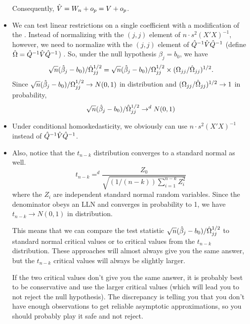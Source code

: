 \begin{itemize}
  Consequently, $\hat{V} = W_n + o_p = V + o_p$.

\item We can test linear restrictions on a single coefficient with a
  modification of the \ttest.  Instead of normalizing with the $(j,j)$
  element of $n \cdot s^2 (X'X)^{-1}$, however, we need to normalize with
  the $(j,j)$ element of $\hat{Q}^{-1} \hat{V} \hat{Q}^{-1}$ (define $\hat{\Omega} =
  \hat{Q}^{-1} \hat{V} \hat{Q}^{-1}$) .  So, under the null hypothesis $\beta_j = b_0$,
  we have
  \begin{equation*}
    \sqrt{n} (\hat{\beta}_j - b_0) / \hat{\Omega}_{jj}^{1/2} =
    \sqrt{n} (\hat{\beta}_j - b_0) / \Omega_{jj}^{1/2} \times (\Omega_{jj} / \hat{\Omega}_{jj})^{1/2}.
  \end{equation*}
  Since $\sqrt{n} (\hat{\beta}_j - b_0) / \Omega_{jj}^{1/2} \to N(0, 1)$ in
  distribution and $(\Omega_{jj} / \hat{\Omega}_{jj})^{1/2} \to 1$ in probability,
  \begin{equation*}
    \sqrt{n} (\hat{\beta}_j - b_0) / \hat{\Omega}_{jj}^{1/2} \to^d N(0,1)
  \end{equation*}

\item Under conditional homoskedasticity, we obviously can use $n \cdot s^2
  (X'X)^{-1}$ instead of $\hat{Q}^{-1} \hat{V} \hat{Q}^{-1}$.

\item Also, notice that the $t_{n-k}$ distribution converges to a
  standard normal as well.
  \begin{equation*}
    t_{n-k} =^d \frac{Z_0}{\sqrt{(1/(n-k)) \sum_{i=1}^{n-k} Z_i^2}}
  \end{equation*}
  where the $Z_i$ are independent standard normal random variables.
  Since the denominator obeys an LLN and converges in probability to
  1, we have $t_{n-k} \to N(0,1)$ in distribution.

  This means that we can compare the test statistic $\sqrt{n} (\hat{\beta}_j -
  b_0) / \hat{\Omega}_{jj}^{1/2}$ to standard normal critical values or to
  critical values from the $t_{n-k}$ distribution.  These approaches
  will almost always give you the same answer, but the $t_{n-k}$
  critical values will always be slightly larger.

  If the two critical values don't give you the same answer, it is
  probably best to be conservative and use the larger critical values
  (which will lead you to not reject the null hypothesis).  The
  discrepancy is telling you that you don't have enough observations
  to get reliable asymptotic approximations, so you should probably
  play it safe and not reject.


\end{itemize}
